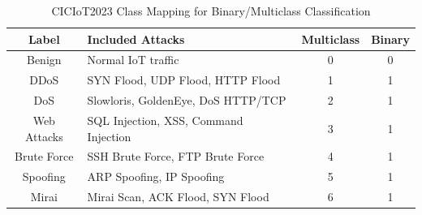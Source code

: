 \documentclass[journal,twoside,web]{ieeecolor}
\begin{document}
\begin{table}[!t]
\caption{CICIoT2023 Class Mapping for Binary/Multiclass Classification}

\label{tab:ciciot2023_mapping}
\centering
\footnotesize
\begin{tabularx}{\columnwidth}{|c|X|c|c|}
\hline
\textbf{Label} & \textbf{Included Attacks} & \textbf{Multiclass} & \textbf{Binary} \\ \hline
Benign & Normal IoT traffic & 0 & 0 \\ \hline
DDoS & SYN Flood, UDP Flood, HTTP Flood & 1 & 1 \\ \hline
DoS & Slowloris, GoldenEye, DoS HTTP/TCP & 2 & 1 \\ \hline
Web Attacks & SQL Injection, XSS, Command Injection & 3 & 1 \\ \hline
Brute Force & SSH Brute Force, FTP Brute Force & 4 & 1 \\ \hline
Spoofing & ARP Spoofing, IP Spoofing & 5 & 1 \\ \hline
Mirai & Mirai Scan, ACK Flood, SYN Flood & 6 & 1 \\ \hline

\end{tabularx}
\end{table}
\end{document}
